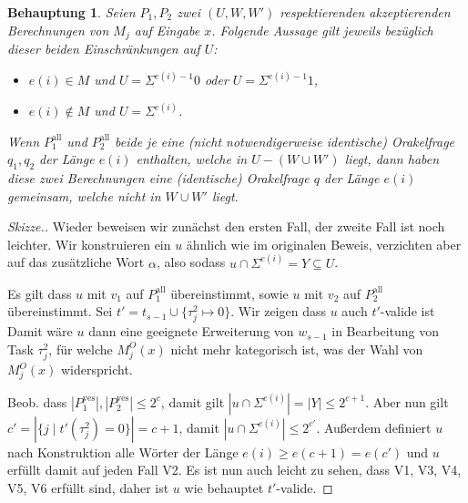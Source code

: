 \documentclass[nofonts]{uebung}
\newtheorem{claim}[theorem]{Behauptung}
\theoremstyle{definition}
\begin{document}
\begin{claim}
    Seien $P_1, P_2$ zwei $(U, W, W')$ respektierenden akzeptierenden Berechnungen von $M_j$ auf Eingabe $x$.
    Folgende Aussage gilt jeweils bezüglich dieser beiden Einschränkungen auf $U$:
    \begin{itemize}[nosep]
        \item $e(i)\in M$ und $U=\Sigma^{e(i)-1}0$ oder $U=\Sigma^{e(i)-1}1$,
        \item $e(i)\not\in M$ und $U=\Sigma^{e(i)}$.
    \end{itemize}

    Wenn $P^\mathrm{all}_1$ und $P^\mathrm{all}_2$ beide je eine (nicht notwendigerweise identische) Orakelfrage $q_1, q_2$ der Länge $e(i)$ enthalten, welche in $U-(W\cup W')$ liegt, dann haben diese zwei Berechnungen eine (identische) Orakelfrage $q$ der Länge $e(i)$ gemeinsam, welche nicht in $W\cup W'$ liegt.
\end{claim}
\begin{proof}[Skizze.]
    Wieder beweisen wir zunächst den ersten Fall, der zweite Fall ist noch leichter.
    Wir konstruieren ein $u$ ähnlich wie im originalen Beweis, verzichten aber auf das zusätzliche Wort $\alpha$, also sodass $u\cap\Sigma^{e(i)}=Y\subseteq U$.

    Es gilt dass $u$ mit $v_1$ auf $P^\mathrm{all}_1$ übereinstimmt, sowie $u$ mit $v_2$ auf $P^\mathrm{all}_2$ übereinstimmt.
    Sei $t'=t_{s-1}\cup \{\tau^2_j\mapsto 0\}$.
    Wir zeigen dass $u$ auch $t'$-valide ist
    Damit wäre $u$ dann eine geeignete Erweiterung von $w_{s-1}$ in Bearbeitung von Task $\tau^2_j$, für welche $M_j^O(x)$ nicht mehr kategorisch ist, was der Wahl von $M_j^O(x)$ widerspricht.

    Beob. dass $|P^\mathrm{yes}_1|,|P^\mathrm{yes}_2|\leq 2^{c}$,
    damit gilt $|u\cap\Sigma^{e(i)}|=|Y|\leq 2^{c+1}$.
    Aber nun gilt $c'=|\{j\mid t'(\tau^2_j)=0\}|=c+1$, damit $|u\cap\Sigma^{e(i)}|\leq 2^{c'}$.
    Außerdem definiert $u$ nach Konstruktion alle Wörter der Länge $e(i)\geq e(c+1)=e(c')$ und $u$ erfüllt damit auf jeden Fall V2.
    Es ist nun auch leicht zu sehen, dass V1, V3, V4, V5, V6 erfüllt sind, daher ist $u$ wie behauptet $t'$-valide.
    \medskip
\end{proof}
\end{document}
